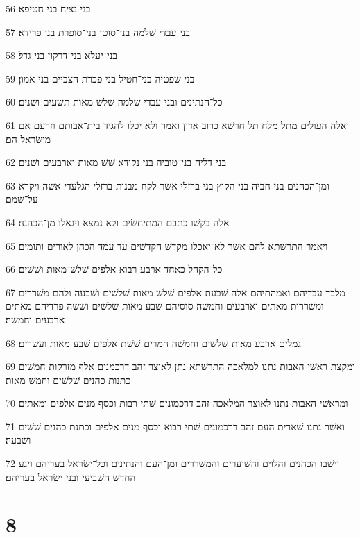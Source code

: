 \par 56 בני נציח בני חטיפא׃
\par 57 בני עבדי שׁלמה בני־סוטי בני־סופרת בני פרידא׃
\par 58 בני־יעלא בני־דרקון בני גדל׃
\par 59 בני שׁפטיה בני־חטיל בני פכרת הצביים בני אמון׃
\par 60 כל־הנתינים ובני עבדי שׁלמה שׁלשׁ מאות תשׁעים ושׁנים׃
\par 61 ואלה העולים מתל מלח תל חרשׁא כרוב אדון ואמר ולא יכלו להגיד בית־אבותם וזרעם אם מישׂראל הם׃
\par 62 בני־דליה בני־טוביה בני נקודא שׁשׁ מאות וארבעים ושׁנים׃
\par 63 ומן־הכהנים בני חביה בני הקוץ בני ברזלי אשׁר לקח מבנות ברזלי הגלעדי אשׁה ויקרא על־שׁמם׃
\par 64 אלה בקשׁו כתבם המתיחשׂים ולא נמצא ויגאלו מן־הכהנה׃
\par 65 ויאמר התרשׁתא להם אשׁר לא־יאכלו מקדשׁ הקדשׁים עד עמד הכהן לאורים ותומים׃
\par 66 כל־הקהל כאחד ארבע רבוא אלפים שׁלשׁ־מאות ושׁשׁים׃
\par 67 מלבד עבדיהם ואמהתיהם אלה שׁבעת אלפים שׁלשׁ מאות שׁלשׁים ושׁבעה ולהם משׁררים ומשׁררות מאתים וארבעים וחמשׁה׃ סוסיהם שׁבע מאות שׁלשׁים ושׁשׁה פרדיהם מאתים ארבעים וחמשׁה׃
\par 68 גמלים ארבע מאות שׁלשׁים וחמשׁה חמרים שׁשׁת אלפים שׁבע מאות ועשׂרים׃
\par 69 ומקצת ראשׁי האבות נתנו למלאכה התרשׁתא נתן לאוצר זהב דרכמנים אלף מזרקות חמשׁים כתנות כהנים שׁלשׁים וחמשׁ מאות׃
\par 70 ומראשׁי האבות נתנו לאוצר המלאכה זהב דרכמונים שׁתי רבות וכסף מנים אלפים ומאתים׃
\par 71 ואשׁר נתנו שׁארית העם זהב דרכמונים שׁתי רבוא וכסף מנים אלפים וכתנת כהנים שׁשׁים ושׁבעה׃
\par 72 וישׁבו הכהנים והלוים והשׁוערים והמשׁררים ומן־העם והנתינים וכל־ישׂראל בעריהם ויגע החדשׁ השׁביעי ובני ישׂראל בעריהם׃

\chapter{8}

